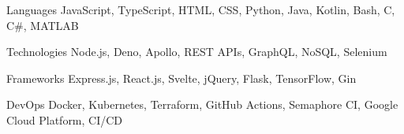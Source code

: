 

\begin{cvskills}

  \cvskill
    {Languages} %
    {JavaScript, TypeScript, HTML, CSS, Python, Java, Kotlin, Bash, C, C\#, MATLAB } %

  \cvskill
    {Technologies} %
    {Node.js, Deno, Apollo, REST APIs, GraphQL, NoSQL, Selenium} %

  \cvskill
    {Frameworks} %
    {Express.js, React.js, Svelte, jQuery, Flask, TensorFlow, Gin} %

  \cvskill
    {DevOps} %
    {Docker, Kubernetes, Terraform, GitHub Actions, Semaphore CI, Google Cloud Platform, CI/CD} %

\end{cvskills}
